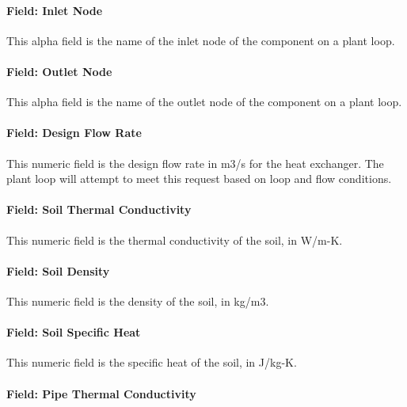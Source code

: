 \paragraph{Field: Inlet Node}\label{field-inlet-node}

This alpha field is the name of the inlet node of the component on a plant loop.

\paragraph{Field: Outlet Node}\label{field-outlet-node}

This alpha field is the name of the outlet node of the component on a plant loop.

\paragraph{Field: Design Flow Rate}\label{field-design-flow-rate-1-000}

This numeric field is the design flow rate in m3/s for the heat exchanger. The plant loop will attempt to meet this request based on loop and flow conditions.

\paragraph{Field: Soil Thermal Conductivity}\label{field-soil-thermal-conductivity}

This numeric field is the thermal conductivity of the soil, in W/m-K.

\paragraph{Field: Soil Density}\label{field-soil-density}

This numeric field is the density of the soil, in kg/m3.

\paragraph{Field: Soil Specific Heat}\label{field-soil-specific-heat}

This numeric field is the specific heat of the soil, in J/kg-K.

\paragraph{Field: Pipe Thermal Conductivity}\label{field-pipe-thermal-conductivity-1}


